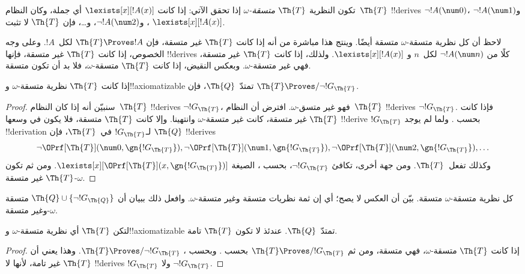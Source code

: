 \documentclass[../../../include/open-logic-section]{subfiles}
\begin{document}
\begin{defn}
تكون النظرية $\Th{T}$ \emph{متسقة-$\omega$} إذا تحقق الآتي: إذا
كانت $\lexists[x][!A(x)]$ أي جملة، وكان النظام~$\Th{T}$ !!{derive}s
$\lnot !A(\num 0)$، و$\lnot !A(\num 1)$، و$\lnot !A(\num 2)$،
و\dots، فإن $\Th{T}$ لا تثبت $\lexists[x][!A(x)]$.
\end{defn}

لاحظ أن كل نظرية متسقة-$\omega$ متسقة أيضًا. وينتج هذا مباشرة من أنه
إذا كانت $\Th{T}$ غير متسقة، فإن $\Th{T}\Proves !A$ لكل~$!A$. وعلى وجه
الخصوص، إذا كانت $\Th{T}$ غير متسقة، فإنها !!{derive}s
كلًا من $\lnot !A(\num n)$ لكل~$n$ و
$\lexists[x][!A(x)]$. ولذلك، إذا كانت $\Th{T}$ غير متسقة، فهي غير
متسقة-$\omega$. وبعكس النقيض، إذا كانت $\Th{T}$ متسقة-$\omega$، فلا
بد أن تكون متسقة.

\begin{lem}
إذا كانت $\Th{T}$ نظرية متسقة-$\omega$ و!!{axiomatizable}
تمتدّ~$\Th{Q}$، فإن $\Th{T}\Proves/\lnot !G_\Th{T}$.
\end{lem}

\begin{proof}
سنبيّن أنه إذا كان النظام~$\Th{T}$ !!{derive}s $\lnot !G_\Th{T}$،
فهو غير متسق-$\omega$. افترض أن النظام~$\Th{T}$ !!{derive}s
$\lnot !G_\Th{T}$. فإذا كانت $\Th{T}$ غير متسقة، كانت غير
متسقة-$\omega$ وانتهينا. وإلا كانت $\Th{T}$ متسقة، فلا يكون في وسعها !!{derive}
$!G_\Th{T}$ بحسب . ولما لم يوجد
!!{derivation} لـ$!G_\Th{T}$ في~$\Th{T}$، فإن $\Th{Q}$ !!{derive}s
\[
\lnot \OPrf[\Th{T}](\num 0, \gn{!G_\Th{T}}), \lnot \OPrf[\Th{T}](\num 1,
\gn{!G_\Th{T}}), \lnot \OPrf[\Th{T}](\num 2, \gn{!G_\Th{T}}), \dots
\]
وكذلك تفعل~$\Th{T}$. ومن جهة أخرى، تكافئ $\lnot !G_\Th{T}$، بحسب
، الصيغة
$\lexists[x][\OPrf[\Th{T}](x,\gn{!G_\Th{T}})]$. ومن ثم تكون
$\Th{T}$ غير متسقة-$\omega$.
\end{proof}

\begin{prob}
  كل نظرية متسقة-$\omega$ متسقة. بيّن أن العكس لا يصح؛ أي إن ثمة
  نظريات متسقة وغير متسقة-$\omega$. وافعل ذلك ببيان أن
  $\Th{Q}\cup\{\lnot !G_\Th{Q}\}$ متسقة وغير متسقة-$\omega$.
\end{prob}

\begin{thm}
 لتكن $\Th{T}$ أي نظرية
متسقة-$\omega$ و!!{axiomatizable} تمتدّ~$\Th{Q}$. عندئذ لا تكون
$\Th{T}$ تامة.
\end{thm}

\begin{proof}
  إذا كانت $\Th{T}$ متسقة-$\omega$، فهي متسقة، ومن ثم
  $\Th{T}\Proves/ !G_\Th{T}$ بحسب .
  وبحسب ،
  $\Th{T}\Proves/\lnot !G_\Th{T}$. وهذا يعني أن $\Th{T}$ غير تامة،
  لأنها لا !!{derive}s $!G_\Th{T}$ ولا $\lnot !G_\Th{T}$.
\end{proof}
\end{document}
